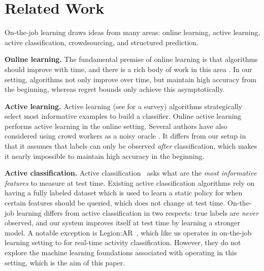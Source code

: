 \section{Related Work}
\label{sec:related}


On-the-job learning draws ideas from many areas:
online learning, active learning, active classification, crowdsourcing, and structured
prediction.


\textbf{Online learning.}
The fundamental premise of online learning is that algorithms should improve
with time, and there is a rich body of work in this area \citep{cesabianchi06prediction}.
In our setting, algorithms not only improve over time, but maintain high accuracy from the beginning,
whereas regret bounds only achieve this asymptotically.

\textbf{Active learning.}
Active learning (see \citet{settles2010active} for a survey) algorithms
strategically select most informative examples to build a classifier.
Online active learning
\citep{helmbold1997some,sculley2007online,chu2011unbiased}
performs active learning in the online setting.
Several authors have also considered using crowd workers as a noisy oracle
\citep{donmez2008proactive,golovin2010near,yan2011active,vijayanarasimhan2014large}.
It differs from our setup in that 
it assumes that labels can only be observed {\em after} classification,
which makes it nearly impossible to maintain high accuracy in the beginning.


\textbf{Active classification.}
Active classification~\cite{greiner2002learning,chai2004test,esmeir2007anytime}
asks what are the {\em most informative features} to measure at test time.
Existing active classification algorithms rely on having a fully labeled
dataset which is used to learn a static policy for when certain features should
be queried, which does not change at test time.
On-the-job learning differs from active classification in two respects: true
labels are {\em never} observed, and our system improves itself at test
time by learning a stronger model.
A notable exception is Legion:AR~\cite{lasecki2013real},
which like us operates in on-the-job learning setting
to for real-time activity classification.
However, they do not explore the machine learning foundations associated
with operating in this setting, which is the aim of this paper.


